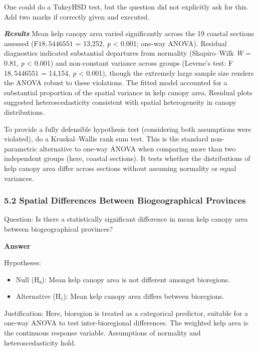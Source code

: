 \documentclass[
  british,
  10pt,
]{article}
\providecommand{\tightlist}{%
  \setlength{\itemsep}{0pt}\setlength{\parskip}{0pt}}
\begin{document}
One could do a TukeyHSD test, but the question did not explicitly ask
for this. Add two marks if correctly given and executed.

\textbf{\emph{Results}} Mean kelp canopy area varied significantly
across the 19 coastal sections assessed (F\({18,5446551}\) = 13,252,
\emph{p} \textless{} 0.001; one-way ANOVA). Residual diagnostics
indicated substantial departures from normality (Shapiro--Wilk \emph{W}
= 0.81, \emph{p} \textless{} 0.001) and non-constant variance across
groups (Levene's test: F\({18,5446551}\) = 14,154, \emph{p} \textless{}
0.001), though the extremely large sample size renders the ANOVA robust
to these violations. The fitted model accounted for a substantial
proportion of the spatial variance in kelp canopy area. Residual plots
suggested heteroscedasticity consistent with spatial heterogeneity in
canopy distributions.

To provide a fully defensible hypothesis test (considering both
assumptions were violated), do a Kruskal--Wallis rank sum test. This is
the standard non-parametric alternative to one-way ANOVA when comparing
more than two independent groups (here, coastal sections). It tests
whether the distributions of kelp canopy area differ across sections
without assuming normality or equal variances.

\subsubsection{5.2 Spatial Differences Between Biogeographical
Provinces}\label{spatial-differences-between-biogeographical-provinces}

Question: Is there a statistically significant difference in mean kelp
canopy area between biogeographical provinces?

\textbf{Answer}

Hypotheses:

\begin{itemize}
\tightlist
\item
  Null (H₀): Mean kelp canopy area is not different amongst bioregions.
\item
  Alternative (H₁): Mean kelp canopy area differs between bioregions.
\end{itemize}

Justification: Here, bioregion is treated as a categorical predictor,
suitable for a one-way ANOVA to test inter-bioregional differences. The
weighted kelp area is the continuous response variable. Assumptions of
normality and heteroscedasticity hold.
\end{document}
